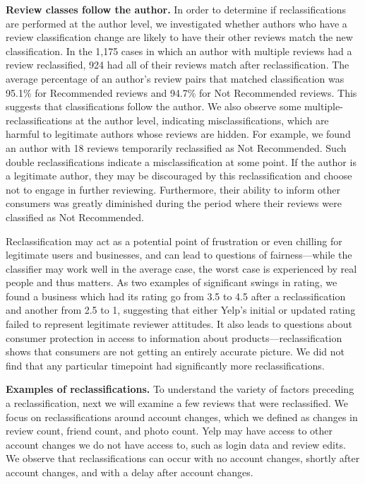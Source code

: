 \textbf{Review classes follow the author.} In order to determine if reclassifications are performed at the author level, we investigated whether authors who have a review classification change are likely to have their other reviews match the new classification. In the 1,175 cases in which an author with multiple reviews had a review reclassified, 924 had all of their reviews match after reclassification. The average percentage of an author's review pairs that matched classification was 95.1\% for Recommended reviews and 94.7\% for Not Recommended reviews. This suggests that classifications follow the author. We also observe some multiple-reclassifications at the author level, indicating misclassifications, which are harmful to legitimate authors whose reviews are hidden. For example, we found an author with 18 reviews temporarily reclassified as Not Recommended. Such double reclassifications indicate a misclassification at some point. If the author is a legitimate author, they may be discouraged by this reclassification and choose not to engage in further reviewing. Furthermore, their ability to inform other consumers was greatly diminished during the period where their reviews were classified as Not Recommended.

Reclassification may act as a potential point of frustration or even chilling for legitimate users and businesses, and can lead to questions of fairness---while the classifier may work well in the average case, the worst case is experienced by real people and thus matters. As two examples of significant swings in rating, we found a business which had its rating go from 3.5 to 4.5 after a reclassification and another from 2.5 to 1, suggesting that either Yelp's initial or updated rating failed to represent legitimate reviewer attitudes.  It also leads to questions about consumer protection in access to information about products---reclassification shows that consumers are not getting an entirely accurate picture. We did not find that any particular timepoint had significantly more reclassifications.

\textbf{Examples of reclassifications.} To understand the variety of factors preceding a reclassification, next we will examine a few reviews that were reclassified. We focus on reclassifications around account changes, which we defined as changes in review count, friend count, and photo count. Yelp may have access to other account changes we do not have access to, such as login data and review edits. We observe that reclassifications can occur with no account changes, shortly after account changes, and with a delay after account changes.

